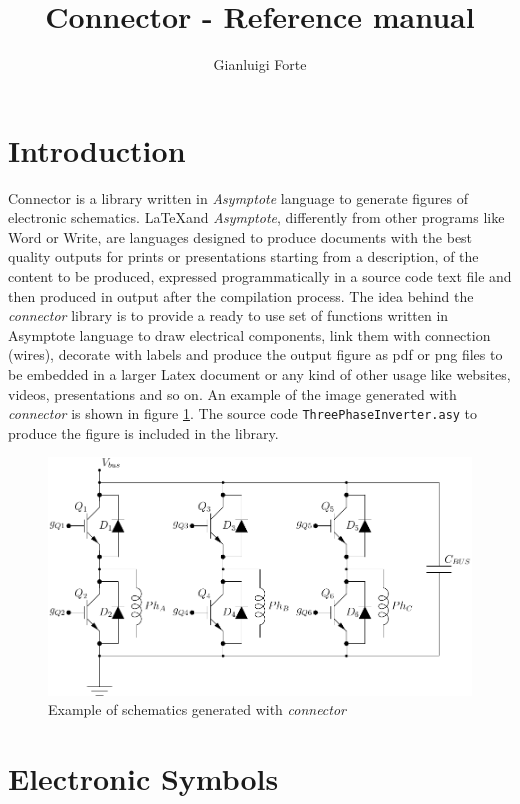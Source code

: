 \documentclass[a4paper,12pt]{report}
\title{Connector - Reference manual }
\author{Gianluigi Forte}
\begin{document}
\maketitle

\section*{Introduction}

Connector is a library written in \emph{Asymptote} language to generate figures of electronic schematics. \LaTeX and \emph{Asymptote}, differently from other programs like Word or Write, are languages designed to produce documents with the best quality outputs for prints or presentations starting from a description, of the content to be produced, expressed programmatically in a source code text file and then produced in output after the compilation process. The idea behind the \emph{connector} library is to provide a ready to use set of functions written in Asymptote language to draw electrical components, link them with connection (wires), decorate with labels and produce the output figure as pdf or png files to be embedded in a larger Latex document or any kind of other usage like websites, videos, presentations and so on. An example of the image generated with \emph{connector} is shown in figure \ref{threePhaseInverterExample}. The source code \texttt{ThreePhaseInverter.asy} to produce the figure is included in the library.

\begin{figure}[ht]
  \centering
  \includegraphics[width=1.0\textwidth]{ThreePhaseInverter.pdf}
  \caption{Example of schematics generated with \emph{connector}}
  \label{threePhaseInverterExample}
\end{figure}

\section*{Electronic Symbols}
\end{document}
